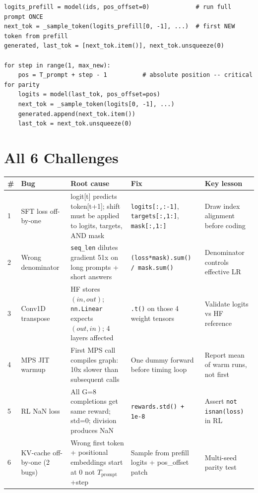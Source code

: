 \documentclass[10pt,a4paper]{article}
\newcommand{\TH}[1]{\cellcolor{BGT}\textbf{\textsf{\small #1}}}
\newcommand{\TA}{\rowcolor{BGT2}}
\begin{document}
\begin{lstlisting}[caption={Prefill + decode with pos\_offset (inference/generate.py)}]
logits_prefill = model(ids, pos_offset=0)             # run full prompt ONCE
next_tok = _sample_token(logits_prefill[0, -1], ...)  # first NEW token from prefill
generated, last_tok = [next_tok.item()], next_tok.unsqueeze(0)

for step in range(1, max_new):
    pos = T_prompt + step - 1          # absolute position -- critical for parity
    logits = model(last_tok, pos_offset=pos)
    next_tok = _sample_token(logits[0, -1], ...)
    generated.append(next_tok.item())
    last_tok = next_tok.unsqueeze(0)
\end{lstlisting}

\section{All 6 Challenges}

\begin{center}
\small
\begin{tabularx}{\linewidth}{@{}C{0.4cm}L{2.6cm}L{4.2cm}L{4.2cm}L{2.7cm}@{}}
\toprule
\TH{\#} & \TH{Bug} & \TH{Root cause} & \TH{Fix} & \TH{Key lesson} \\
 & SFT loss off-by-one &
  logit[t] predicts token[t+1]; shift must be applied to logits, targets, AND mask &
  \texttt{logits[:,:-1]}, \texttt{targets[:,1:]}, \texttt{mask[:,1:]} &
  Draw index alignment before coding \\
\TA 2 & Wrong denominator &
  \texttt{seq\_len} dilutes gradient 51x on long prompts + short answers &
  \texttt{(loss*mask).sum() / mask.sum()} &
  Denominator controls effective LR \\
3 & Conv1D transpose &
  HF stores $(in,out)$; \texttt{nn.Linear} expects $(out,in)$; 4 layers affected &
  \texttt{.t()} on those 4 weight tensors &
  Validate logits vs HF reference \\
\TA 4 & MPS JIT warmup &
  First MPS call compiles graph: 10x slower than subsequent calls &
  One dummy forward before timing loop &
  Report mean of warm runs, not first \\
5 & RL NaN loss &
  All G=8 completions get same reward; std=0; division produces NaN &
  \texttt{rewards.std() + 1e-8} &
  Assert \texttt{not isnan(loss)} in RL \\
\TA 6 & KV-cache off-by-one (2 bugs) &
  Wrong first token + positional embeddings start at 0 not $T_\text{prompt}$+step &
  Sample from prefill logits + pos\_offset patch &
  Multi-seed parity test \\
\bottomrule
\end{tabularx}
\end{center}
\end{document}
